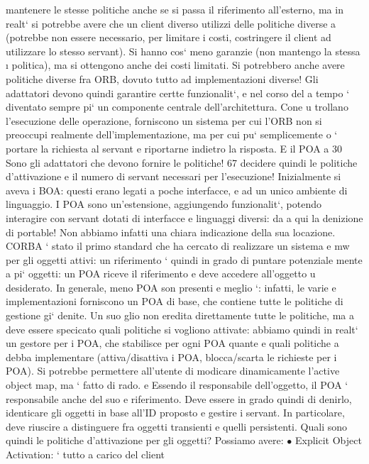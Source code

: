 \documentclass[a4paper,12pt]{article}
\begin{document}
mantenere le stesse politiche anche se si passa il riferimento all'esterno, ma
in realt` si potrebbe avere che un client diverso utilizzi delle politiche diverse
a
(potrebbe non essere necessario, per limitare i costi, costringere il client ad utilizzare lo stesso servant). Si hanno
cos` meno garanzie (non mantengo la stessa
\i{}
politica), ma si ottengono anche dei costi limitati. Si potrebbero anche avere
politiche diverse fra ORB, dovuto tutto ad implementazioni diverse!
Gli adattatori devono quindi garantire certte funzionalit`, e nel corso del
a
tempo ` diventato sempre pi` un componente centrale dell'architettura. Cone
u
trollano l'esecuzione delle operazione, forniscono un sistema per cui l'ORB non
si preoccupi realmente dell'implementazione, ma per cui pu` semplicemente
o
`
portare la richiesta al servant e riportarne indietro la risposta. E il POA a
30 Sono
gli adattatori che devono fornire le politiche!
67
decidere quindi le politiche d'attivazione e il numero di servant necessari per
l'esecuzione!
Inizialmente si aveva i BOA: questi erano legati a poche interfacce, e ad un
unico ambiente di linguaggio. I POA sono un'estensione, aggiungendo funzionalit`, potendo interagire con servant dotati
di interfacce e linguaggi diversi: da
a
qui la denizione di portable! Non abbiamo infatti una chiara indicazione della
sua locazione.
CORBA ` stato il primo standard che ha cercato di realizzare un sistema
e
mw per gli oggetti attivi: un riferimento ` quindi in grado di puntare potenziale
mente a pi` oggetti: un POA riceve il riferimento e deve accedere all'oggetto
u
desiderato. In generale, meno POA son presenti e meglio `: infatti, le varie
e
implementazioni forniscono un POA di base, che contiene tutte le politiche di
gestione gi` denite. Un suo glio non eredita direttamente tutte le politiche, ma
a
deve essere specicato quali politiche si vogliono attivate: abbiamo quindi in realt` un gestore per i POA, che
stabilisce per ogni POA quante e quali politiche
a
debba implementare (attiva/disattiva i POA, blocca/scarta le richieste per i
POA). Si potrebbe permettere all'utente di modicare dinamicamente l'active
object map, ma ` fatto di rado.
e
Essendo il responsabile dell'oggetto, il POA ` responsabile anche del suo
e
riferimento. Deve essere in grado quindi di denirlo, identicare gli oggetti in
base all'ID proposto e gestire i servant. In particolare, deve riuscire a distinguere
fra oggetti transienti e quelli persistenti.
Quali sono quindi le politiche d'attivazione per gli oggetti? Possiamo avere:
$\bullet$ Explicit Object Activation: ` tutto a carico del client
\end{document}
